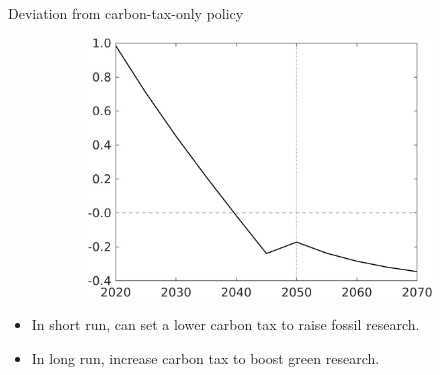 \documentclass[11pt,aspectratio=169]{beamer}
\begin{document}
\begin{frame}{Deviation from carbon-tax-only policy}
\begin{figure}
\begin{subfigure}{0.4\textwidth}
		\includegraphics[width=1\textwidth]{../codding_model/own_basedOnFried/optimalPol_010922_revision/figures/all_13Sept22_Tplus30/sffsg_OPT_T_NoTaus_COMPtaulPer_regime4_spillover0_knspil0_noskill0_sep0_xgrowth0_PV1_etaa0.79.png}
	\end{subfigure}
\end{figure}
\vspace{3mm}
\pause
\begin{block}{}
	\begin{itemize}
		\item<+-> In short run, can set a lower carbon tax to raise fossil research.
		\item<+-> In long run, increase carbon tax to boost green research.
	\end{itemize}
\end{block}	
\end{frame}
\end{document}
